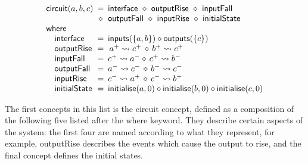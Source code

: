 \documentclass[british,compsoc]{IEEEtran}
\begin{document}
\vspace{-3mm}
\[
\begin{array}{lcl}
\mathsf{circuit}(a,b,c)&\hspace{-2mm}=&\hspace{-2mm}\mathsf{interface}~\diamond~\mathsf{outputRise}~\diamond~\mathsf{inputFall}\\
~&\hspace{-2mm}\diamond&\hspace{-2mm}\mathsf{outputFall}~\diamond~\mathsf{inputRise}~\diamond~\mathsf{initialState}\\
\mathsf{where}&~&\\
\,\,\,\,\,\,\mathsf{interface}&\hspace{-2mm}=&\hspace{-2mm}\mathsf{inputs}(\{a,b\})\diamond\mathsf{outputs}(\{c\})\\
\,\,\,\,\,\,\mathsf{outputRise}&\hspace{-2mm}=&\hspace{-2mm}\,a^{+}\rightsquigarrow c^{+}\,\diamond\, b^{+}\rightsquigarrow c^{+}\\
\,\,\,\,\,\,\mathsf{inputFall}&\hspace{-2mm}=&\hspace{-2mm}c ^ {+} \rightsquigarrow a^{-} \diamond\, c ^ {+} \rightsquigarrow b^{-}\\
\,\,\,\,\,\,\mathsf{outputFall}&\hspace{-2mm}=&\hspace{-2mm}a^{-} \rightsquigarrow c^{-} \,\diamond\, b^{-} \rightsquigarrow c^{-}\\
\,\,\,\,\,\,\mathsf{inputRise}&\hspace{-2mm}=&\hspace{-2mm}c^{-} \rightsquigarrow a^{+} \,\diamond\, c^{-} \rightsquigarrow b^{+}\\
\,\,\,\,\,\,\mathsf{initialState}&\hspace{-2mm}=&\hspace{-2mm}\mathsf{initialise}(a,0) \diamond \mathsf{initialise}(b,0) \diamond \mathsf{initialise}(c,0)\\
\end{array}
\]

The first concepts in this list is the \textsf{circuit} concept, defined as a
composition of the following five listed after the \textsf{where} keyword.
They describe certain aspects of the system: the first four are named
according to what they represent, for example, \textsf{outputRise} describes
the events which cause the output to rise, and the final concept defines
the initial states.
\end{document}
